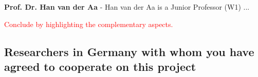 \documentclass{scrartcl}
\newcommand\todo[1]{\textcolor{red}{#1}}
\begin{document}
\textbf{Prof. Dr. Han van der Aa} - Han van der Aa is a Junior Professor (W1) ...

\todo{Conclude by highlighting the complementary aspects.}

\subsection{Researchers in Germany with whom you have agreed to cooperate on this project}
\label{sec:collab:germany}

%
%
%
\end{document}
